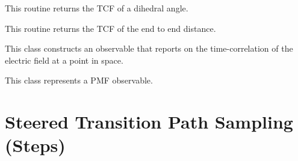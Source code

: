 \documentclass[letterpaper,10pt,english]{sphinxmanual}
\begin{document}

\begin{fulllineitems}
\label{applications/applications.doc:observables.dihedral_fluctuation_correlation_2}
This routine returns the TCF of a dihedral angle.

\end{fulllineitems}


\begin{fulllineitems}
\label{applications/applications.doc:observables.dist_fluctuation_correlation}
This routine returns the TCF of the end to end distance.

\end{fulllineitems}


\begin{fulllineitems}
\label{applications/applications.doc:observables.electric_field}
This class constructs an observable that reports on the time-correlation 
of the electric field at a point in space.

\end{fulllineitems}


\begin{fulllineitems}
\label{applications/applications.doc:observables.pmf}
This class represents a PMF observable.

\end{fulllineitems}



\section{Steered Transition Path Sampling (Steps)}
\label{applications/applications.doc:steered-transition-path-sampling-steps}
\end{document}
